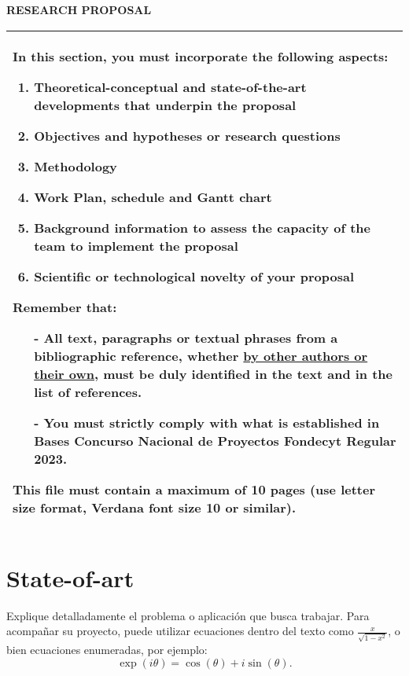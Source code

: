 \documentclass[demo, MAIN.tex]{subfiles}
\begin{document}
\noindent\textbf{RESEARCH PROPOSAL}

\bigskip

\noindent\begin{tabularx}{\textwidth}{|>{\columncolor{tcc}}X|}
  \hline In this section, you must incorporate the following aspects:
  \begin{enumerate}[label={\alph*)},nosep]
  \item Theoretical-conceptual and state-of-the-art developments that
    underpin the proposal
  \item Objectives and hypotheses or research questions
  \item Methodology
  \item Work Plan, schedule and Gantt chart
  \item Background information to assess the capacity of the team to
    implement the proposal
  \item Scientific or technological novelty of your proposal
  \end{enumerate}

  \medskip

  Remember that:
  \begin{itemize}
    \vspace{-0.3cm}
  \item[-] All text, paragraphs or textual phrases from a
    bibliographic reference, whether \underline{by other authors or their own},
    must be duly identified in the text and in the list of references.
    \vspace*{-0.6cm}
  \item[-] You must strictly comply with what is established in
    Bases Concurso Nacional de Proyectos Fondecyt Regular 2023.
  \end{itemize}
  
  \medskip
  \vspace{-0.3cm}
  This file must contain a maximum of \textbf{10 pages} (use letter size
  format, Verdana font size 10 or similar).\\  \hline
\end{tabularx}

\section{State-of-art}

Explique detalladamente el problema o aplicación que busca
trabajar. Para acompañar su proyecto, puede utilizar ecuaciones dentro
del texto como $\frac{x}{\sqrt{1-x^2}}$, o bien ecuaciones enumeradas,
por ejemplo:
\begin{equation}\label{eq:euler}
\exp(i\theta) = \cos(\theta) + i\sin(\theta).
\end{equation}
\end{document}
